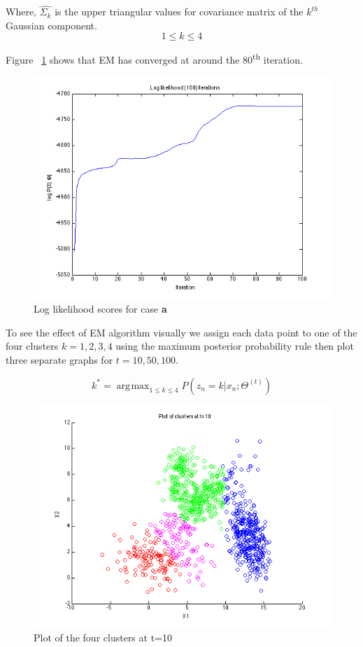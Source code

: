 \documentclass[a4paper]{article}
\DeclareMathOperator*{\argmax}{\arg\!\max}
\begin{document}
Where, $\hat{\Sigma_k}$ is the upper triangular values for covariance matrix of the $k^{th}$ Gaussian component. $$1 \le k \le 4$$

Figure ~\ref{fig:log_likelihood_a} shows that EM has converged at around the 80\textsuperscript{th} iteration.

\begin{figure}[H]
  \centering
    \includegraphics[scale=.57]{images/log_likelihood_scores.png}
  \caption{Log likelihood scores for case \textbf{a}}
  \label{fig:log_likelihood_a}
\end{figure}

To see the effect of EM algorithm visually we assign each data point to one of the four clusters $k = 1,2,3,4$ using the maximum posterior probability rule then plot three separate graphs for $t = 10,50,100$.

$$ k^* = \argmax_{1 \le k \le 4} P(z_n=k|x_n;\Theta^{(t)}) $$

\begin{figure}[H]
  \centering
    \includegraphics[scale=.57]{images/clusters_t_10.png}
  \caption{Plot of the four clusters at t=10}
\end{figure}
\end{document}
